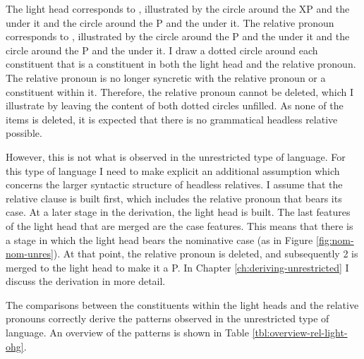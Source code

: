 The light head corresponds to , illustrated by the circle around the XP and the  under it and the circle around the P and the  under it. The relative pronoun corresponds to , illustrated by the circle around the P and the  under it and the circle around the P and the  under it.
I draw a dotted circle around each constituent that is a constituent in both the light head and the relative pronoun.
The relative pronoun is no longer syncretic with the relative pronoun or a constituent within it. Therefore, the relative pronoun cannot be deleted, which I illustrate by leaving the content of both dotted circles unfilled.
As none of the items is deleted, it is expected that there is no grammatical headless relative possible.

However, this is not what is observed in the unrestricted type of language.
For this type of language I need to make explicit an additional assumption which concerns the larger syntactic structure of headless relatives. I assume that the relative clause is built first, which includes the relative pronoun that bears its case.
At a later stage in the derivation, the light head is built. The last features of the light head that are merged are the case features. This means that there is a stage in which the light head bears the nominative case (as in Figure \ref{fig:nom-nom-unres}). At that point, the relative pronoun is deleted, and subsequently 2 is merged to the light head to make it a P. In Chapter \ref{ch:deriving-unrestricted} I discuss the derivation in more detail.

The comparisons between the constituents within the light heads and the relative pronouns correctly derive the patterns observed in the unrestricted type of language. An overview of the patterns is shown in Table \ref{tbl:overview-rel-light-ohg}.

